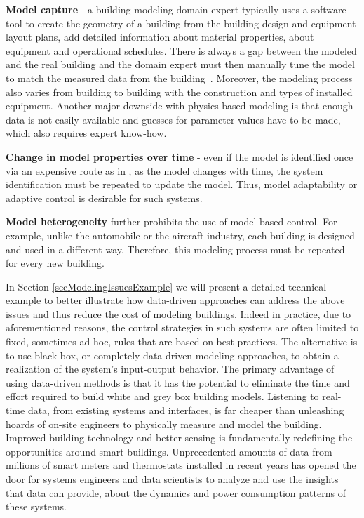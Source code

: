 \begin{enumerate}
	\item \textcolor[rgb]{0,0,1}{\textbf{Model capture} - a building modeling domain expert typically uses a software tool to create the geometry of a building from the building design and equipment layout plans, add detailed information about material properties, about equipment and operational schedules. There is always a gap between the modeled and the real building and the domain expert must then manually tune the model to match the measured data from the building~\cite{New2012}. 
	Moreover, the modeling process also varies from building to building with the construction and types of installed equipment.
	Another major downside with physics-based modeling is that enough data is not easily available and guesses for parameter values have to be made, which also requires expert know-how.
	\item \textbf{Change in model properties over time} - even if the model is identified once via an expensive route as in \cite{Sturzenegger2016}, as the model changes with time, the system identification must be repeated to update the model. Thus, model adaptability or adaptive control is desirable for such systems.
	\item \textbf{Model heterogeneity} further prohibits the use of model-based control. For example, unlike the automobile or the aircraft industry, each building is designed and used in a different way. Therefore, this modeling process must be repeated for every new building. }
\end{enumerate}

\textcolor[rgb]{0,0,1}{
In Section \ref{secModelingIssuesExample} we will present a detailed technical example to better illustrate how data-driven approaches can address the above issues and thus reduce the cost of modeling buildings. Indeed in practice, due to aforementioned reasons, the control strategies in such systems are often limited to fixed, sometimes ad-hoc, rules that are based on best practices. 
The alternative is to use black-box, or completely data-driven modeling approaches, to obtain a realization of the system's input-output behavior. 
The primary advantage of using data-driven methods is that it has the potential to eliminate the time and effort required to build white and grey box building models. 
Listening to real-time data, from existing systems and interfaces, is far cheaper than unleashing hoards of on-site engineers to physically measure and model the building. Improved building technology and better sensing is fundamentally redefining the opportunities around smart buildings. 
Unprecedented amounts of data from millions of smart meters and thermostats installed in recent years has opened the door for systems engineers and data scientists to analyze and use the insights that data can provide, about the dynamics and power consumption patterns of these systems. }

